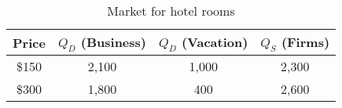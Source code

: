 \begin{table}[H]
  \centering
    \begin{tabular}{|c|c|c|c|}
      \hline
      \textbf{Price} & \textbf{$Q_D$ (Business)} & \textbf{$Q_D$ (Vacation)} & \textbf{$Q_S$ (Firms)} \\
      \hline
      \$150 & 2,100 & 1,000 & 2,300 \\
      \hline
      \$300 & 1,800 & 400   & 2,600 \\
      \hline
    \end{tabular}
    \caption{Market for hotel rooms}
  \end{table}